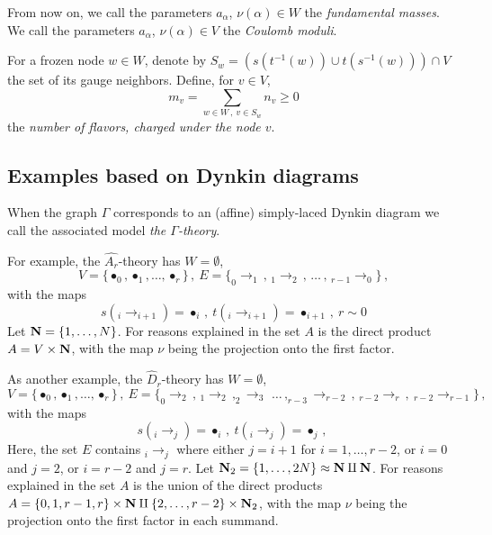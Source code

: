 \documentclass[12pt]{article}
\numberwithin{equation}{section}
\newcommand\beq{\begin{equation}}
\newcommand\eeq{\end{equation}}
\theoremstyle{definition}
\begin{document}
From now on, we call the parameters $a_{\alpha}$, ${\nu}({\alpha}) \in W$ the \emph{fundamental masses}. We call the parameters $a_{\alpha}$, ${\nu}({\alpha}) \in V$ the \emph{Coulomb moduli}.  


For a frozen node $w \in W$, denote by $S_{w} = \left( s (t^{-1}(w)) \cup t(s^{-1}(w)) \right) \cap V$ the set of its gauge neighbors. Define, for $v \in V$, 
\beq
m_{v} = \sum_{w \in W\, , \ v \in S_{w}} n_{v} \geq 0
\eeq
the \emph{number of flavors, charged under the node $v$}.  


\subsection{Examples based on Dynkin diagrams}
When the graph $\Gamma$ corresponds to an (affine) simply-laced Dynkin diagram we call the associated model \emph{the $\Gamma$-theory}. 


For example, the $\widehat{{A}_{r}}$-theory has
$W = {\emptyset}$, 
\beq
V = \{ {\bullet}_{0}, {\bullet}_{1},  \ldots , {\bullet}_{r} \} \, , \ E = \{ _{0}{\rightarrow}_{1}\, , \, _{1}{\rightarrow}_{2}\, , \, \ldots \, , \, _{r-1}{\rightarrow}_{0} \} \, , 
\label{eq:athve}
\eeq
with the maps
\beq
s( _{i}{\rightarrow}_{i+1} ) = {\bullet}_{i} \, , \ t( _{i}{\rightarrow}_{i+1} )  = {\bullet}_{i+1}
\, , \ r \sim 0
\eeq
Let ${\bf N} = \{ 1, \ldots, N \}$. For reasons explained in \cite{Nekrasov2015BPSCFTCN} the set $A$ is the direct product $A = V \times {\bf N}$, with 
the map ${\nu}$ being the projection onto the first factor. 

As another example, the ${\hat D}_{r}$-theory has $W = {\emptyset}$, 
\beq
V = \{ {\bullet}_{0}, {\bullet}_{1},  \ldots , {\bullet}_{r} \} \, , \ E = \{ _{0}{\rightarrow}_{2}\, , \, _{1}{\rightarrow}_{2}\, , _{2}{\rightarrow}_{3}\, \, 
\ldots \, , _{r-3}{\rightarrow}_{r-2} \, , \, _{r-2}{\rightarrow}_{r}\, , \ _{r-2}{\rightarrow}_{r-1} \} \, , 
\label{eq:dthve}
\eeq
with the maps
\beq
s( _{i}{\rightarrow}_{j} ) = {\bullet}_{i} \, , \ t( _{i}{\rightarrow}_{j} )  = {\bullet}_{j}
\, , \ 
\eeq
Here, the set $E$ contains $_{i}{\rightarrow}_{j}$ where either $j=i+1$ for $i=1, \ldots, r-2$, or $i=0$ and $j=2$, or
 $i=r-2$ and $j=r$. Let ${\bf N}_2 = \{ 1, \ldots, 2N \} \approx {\bf N} \amalg {\bf N}$. For reasons explained in \cite{Nekrasov2015BPSCFTCN} the set $A$ is the union of the
direct products $A = \{ 0, 1, r-1, r \} \times {\bf N} \amalg \{ 2, \ldots, r-2 \} \times {\bf N}_{2}$, with 
the map ${\nu}$ being the projection onto the first factor in each summand. 
\end{document}
